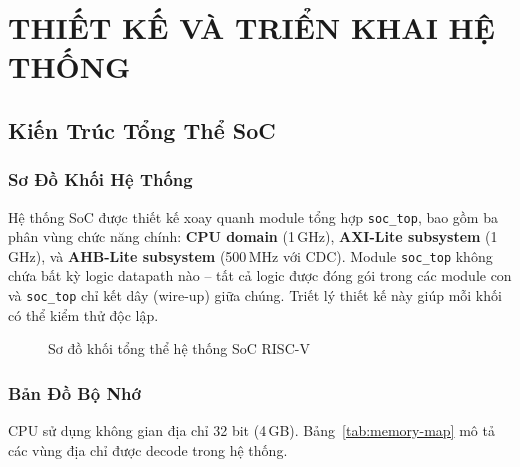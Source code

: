 \chapter{THIẾT KẾ VÀ TRIỂN KHAI HỆ THỐNG}
\label{Chapter4}

\section{Kiến Trúc Tổng Thể SoC}

\subsection{Sơ Đồ Khối Hệ Thống}

Hệ thống SoC được thiết kế xoay quanh module tổng hợp \texttt{soc\_top}, bao gồm ba phân vùng chức năng chính: \textbf{CPU domain} (1\,GHz), \textbf{AXI-Lite subsystem} (1\,GHz), và \textbf{AHB-Lite subsystem} (500\,MHz với CDC). Module \texttt{soc\_top} không chứa bất kỳ logic datapath nào -- tất cả logic được đóng gói trong các module con và \texttt{soc\_top} chỉ kết dây (wire-up) giữa chúng. Triết lý thiết kế này giúp mỗi khối có thể kiểm thử độc lập.

\begin{figure}[htp]
\centering
{}
\caption{Sơ đồ khối tổng thể hệ thống SoC RISC-V}
\label{fig:soc-top-block}
\end{figure}

\subsection{Bản Đồ Bộ Nhớ}

CPU sử dụng không gian địa chỉ 32 bit (4\,GB). Bảng~\ref{tab:memory-map} mô tả các vùng địa chỉ được decode trong hệ thống.

